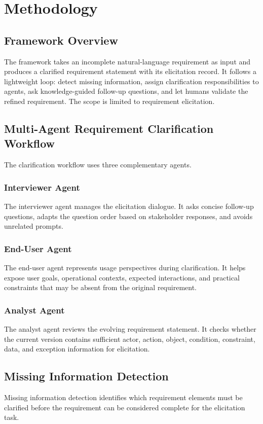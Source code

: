 \section{Methodology}
\label{methodology}

\subsection{Framework Overview}
The framework takes an incomplete natural-language requirement as input and produces a clarified requirement statement with its elicitation record.
It follows a lightweight loop: detect missing information, assign clarification responsibilities to agents, ask knowledge-guided follow-up questions, and let humans validate the refined requirement.
The scope is limited to requirement elicitation.

\subsection{Multi-Agent Requirement Clarification Workflow}
The clarification workflow uses three complementary agents.

\subsubsection{Interviewer Agent}
The interviewer agent manages the elicitation dialogue.
It asks concise follow-up questions, adapts the question order based on stakeholder responses, and avoids unrelated prompts.

\subsubsection{End-User Agent}
The end-user agent represents usage perspectives during clarification.
It helps expose user goals, operational contexts, expected interactions, and practical constraints that may be absent from the original requirement.

\subsubsection{Analyst Agent}
The analyst agent reviews the evolving requirement statement.
It checks whether the current version contains sufficient actor, action, object, condition, constraint, data, and exception information for elicitation.

\subsection{Missing Information Detection}
Missing information detection identifies which requirement elements must be clarified before the requirement can be considered complete for the elicitation task.

